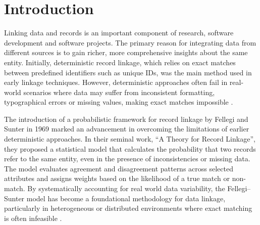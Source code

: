\chapter{Introduction}  \label{sec:introduction}

%


Linking data and records is an important component of research, software development and software projects.
The primary reason for integrating data from different sources is to gain richer, more comprehensive insights about the same entity.
Initially, deterministic record linkage, which relies on exact matches between predefined identifiers such as unique IDs, was the main method used in early linkage techniques.
However, deterministic approaches often fail in real-world scenarios where data may suffer from inconsistent formatting, typographical errors or missing values, making exact matches impossible \cite{herzog2007data}.

The introduction of a probabilistic framework for record linkage by Fellegi and Sunter in 1969 \cite{fellegi1969theory} marked an advancement in overcoming the limitations of earlier deterministic approaches.
In their seminal work, \enquote{A Theory for Record Linkage}, they proposed a statistical model that calculates the probability that two records refer to the same entity, even in the presence of inconsistencies or missing data.
The model evaluates agreement and disagreement patterns across selected attributes and assigns weights based on the likelihood of a true match or non-match.
By systematically accounting for real world data variability, the Fellegi–Sunter model has become a foundational methodology for data linkage, particularly in heterogeneous or distributed environments where exact matching is often infeasible \cite{fellegi1969theory}.


